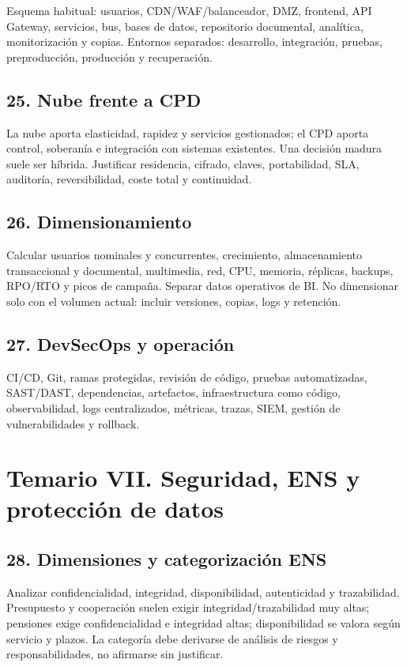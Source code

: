 \documentclass[11pt,a4paper]{article}
\begin{document}
Esquema habitual: usuarios, CDN/WAF/balanceador, DMZ, frontend, API Gateway, servicios, bus, bases de datos, repositorio documental, analítica, monitorización y copias. Entornos separados: desarrollo, integración, pruebas, preproducción, producción y recuperación.

\subsection{25. Nube frente a CPD}

La nube aporta elasticidad, rapidez y servicios gestionados; el CPD aporta control, soberanía e integración con sistemas existentes. Una decisión madura suele ser híbrida. Justificar residencia, cifrado, claves, portabilidad, SLA, auditoría, reversibilidad, coste total y continuidad.

\subsection{26. Dimensionamiento}

Calcular usuarios nominales y concurrentes, crecimiento, almacenamiento transaccional y documental, multimedia, red, CPU, memoria, réplicas, backups, RPO/RTO y picos de campaña. Separar datos operativos de BI. No dimensionar solo con el volumen actual: incluir versiones, copias, logs y retención.

\subsection{27. DevSecOps y operación}

CI/CD, Git, ramas protegidas, revisión de código, pruebas automatizadas, SAST/DAST, dependencias, artefactos, infraestructura como código, observabilidad, logs centralizados, métricas, trazas, SIEM, gestión de vulnerabilidades y rollback.

\section{Temario VII. Seguridad, ENS y protección de datos}

\subsection{28. Dimensiones y categorización ENS}

Analizar confidencialidad, integridad, disponibilidad, autenticidad y trazabilidad. Presupuesto y cooperación suelen exigir integridad/trazabilidad muy altas; pensiones exige confidencialidad e integridad altas; disponibilidad se valora según servicio y plazos. La categoría debe derivarse de análisis de riesgos y responsabilidades, no afirmarse sin justificar.
\end{document}
